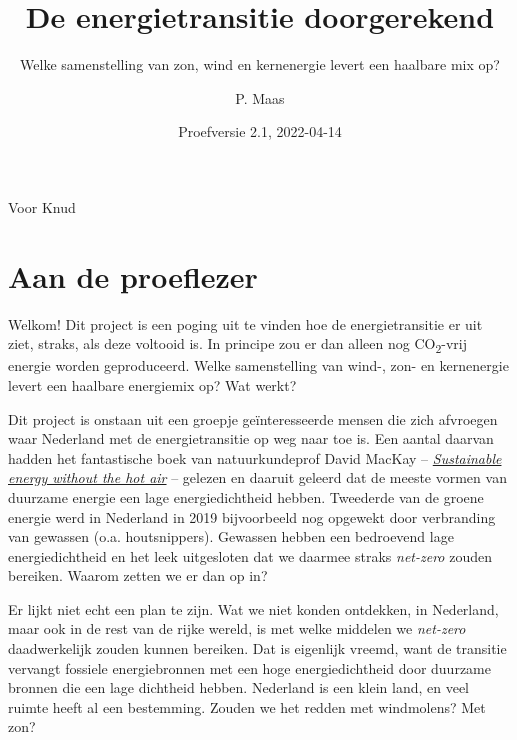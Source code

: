 \documentclass[
  11pt,
  a4paper,
]{book}
\title{De energietransitie doorgerekend}
\subtitle{Welke samenstelling van zon, wind en kernenergie levert een haalbare mix op?}
\author{P. Maas}
\date{Proefversie 2.1, 2022-04-14}
\begin{document}
\maketitle

\begin{titlepage}



\begin{center}

\bigskip

\bigskip

\bigskip

\bigskip

\bigskip

\bigskip

\bigskip

    \Large{Voor Knud} 
\end{center}

\end{titlepage}

{
\hypersetup{linkcolor=}
\setcounter{tocdepth}{4}
\tableofcontents
}
\hypertarget{aan-de-proeflezer}{%
\chapter*{Aan de proeflezer}\label{aan-de-proeflezer}}

Welkom! Dit project is een poging uit te vinden hoe de energietransitie er uit ziet, straks, als deze voltooid is. In principe zou er dan alleen nog CO\textsubscript{2}-vrij energie worden geproduceerd. Welke samenstelling van wind-, zon- en kernenergie levert een haalbare energiemix op? Wat werkt?

Dit project is onstaan uit een groepje geïnteresseerde mensen die zich afvroegen waar Nederland met de energietransitie op weg naar toe is. Een aantal daarvan hadden het fantastische boek van natuurkundeprof David MacKay -- \href{https://www.withouthotair.com/download.html}{\emph{Sustainable energy without the hot air}} -- gelezen en daaruit geleerd dat de meeste vormen van duurzame energie een lage energiedichtheid hebben. Tweederde van de groene energie werd in Nederland in 2019 bijvoorbeeld nog opgewekt door verbranding van gewassen (o.a. houtsnippers). Gewassen hebben een bedroevend lage energiedichtheid en het leek uitgesloten dat we daarmee straks \emph{net-zero} zouden bereiken. Waarom zetten we er dan op in?

Er lijkt niet echt een plan te zijn. Wat we niet konden ontdekken, in Nederland, maar ook in de rest van de rijke wereld, is met welke middelen we \emph{net-zero} daadwerkelijk zouden kunnen bereiken. Dat is eigenlijk vreemd, want de transitie vervangt fossiele energiebronnen met een hoge energiedichtheid door duurzame bronnen die een lage dichtheid hebben. Nederland is een klein land, en veel ruimte heeft al een bestemming. Zouden we het redden met windmolens? Met zon?
\end{document}
